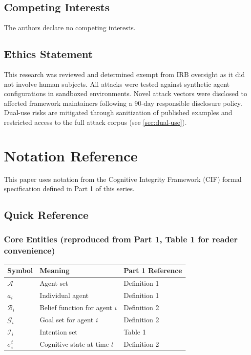 \documentclass[
]{article}
\newcounter{none} %
\begin{document}
\subsection{Competing Interests}\label{competing-interests}

The authors declare no competing interests.

\subsection{Ethics Statement}\label{ethics-statement}

This research was reviewed and determined exempt from IRB oversight as
it did not involve human subjects. All attacks were tested against
synthetic agent configurations in sandboxed environments. Novel attack
vectors were disclosed to affected framework maintainers following a
90-day responsible disclosure policy. Dual-use risks are mitigated
through sanitization of published examples and restricted access to the
full attack corpus (see \cref{sec:dual-use}).

\newpage

\newpage

\section{Notation Reference}\label{sec:notation-reference}

This paper uses notation from the Cognitive Integrity Framework (CIF)
formal specification defined in Part 1 of this series.

\subsection{Quick Reference}\label{quick-reference}

\subsubsection{Core Entities (reproduced from Part 1, Table 1 for reader
convenience)}\label{core-entities-reproduced-from-part-1-table-1-for-reader-convenience}

{\def\LTcaptype{none} %
\begin{longtable}[]{@{}lll@{}}
\toprule\noalign{}
Symbol & Meaning & Part 1 Reference \\
\midrule\noalign{}
\endhead
\bottomrule\noalign{}
\endlastfoot
\(\mathcal{A}\) & Agent set & Definition 1 \\
\(a_i\) & Individual agent & Definition 1 \\
\(\mathcal{B}_i\) & Belief function for agent \(i\) & Definition 2 \\
\(\mathcal{G}_i\) & Goal set for agent \(i\) & Definition 2 \\
\(\mathcal{I}_i\) & Intention set & Table 1 \\
\(\sigma_i^t\) & Cognitive state at time \(t\) & Definition 2 \\
\end{longtable}
}
\end{document}
